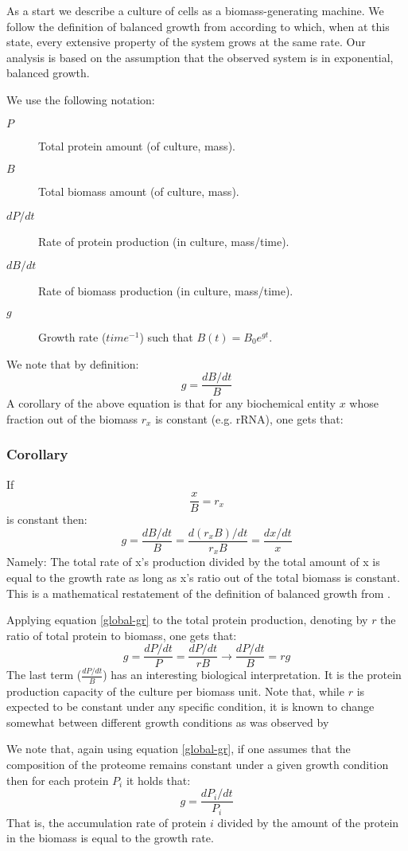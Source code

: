 \documentclass[a4page,notitlepage]{article}
\begin{document}
As a start we describe a culture of cells as a biomass-generating machine.
We follow the definition of balanced growth from \parencite{Campbell1957} according to which, when at this state, every extensive property of the system grows at the same rate.
Our analysis is based on the assumption that the observed system is in exponential, balanced growth.

We use the following notation:
\begin{description}
\item[$P$] Total protein amount (of culture, mass).
\item[$B$] Total biomass amount (of culture, mass).
\item [$dP/dt$] Rate of protein production (in culture, mass/time).
\item [$dB/dt$] Rate of biomass production (in culture, mass/time).
\item [$g$] Growth rate ($time^{-1}$) such that $B(t)=B_0e^{gt}$.
\end{description}
We note that by definition:
\[ g=\frac{dB/dt}{B}\]
A corollary of the above equation is that for any biochemical entity $x$ whose fraction out of the biomass $r_x$ is constant (e.g. rRNA), one gets that:
\subsubsection{Corollary}
If
\[\frac{x}{B}=r_x\]
is constant then:
\begin{equation}
\label{global-gr}
g=\frac{dB/dt}{B}=\frac{d(r_xB)/dt}{r_xB}=\frac{dx/dt}{x}
\end{equation}
Namely: The total rate of x's production divided by the total amount of x is equal to the growth rate as long as x's ratio out of the total biomass is constant.
This is a mathematical restatement of the definition of balanced growth from \parencite{Campbell1957}.

Applying equation \ref{global-gr} to the total protein production, denoting by $r$ the ratio of total protein to biomass, one gets that:
\[g=\frac{dP/dt}{P}=\frac{dP/dt}{rB}\rightarrow\frac{dP/dt}{B}=rg\]
The last term ($\frac{dP/dt}{B}$) has an interesting biological interpretation.
It is the protein production capacity of the culture per biomass unit.
Note that, while $r$ is expected to be constant under any specific condition, it is known to change somewhat between different growth conditions as was observed by \parencite{Bremer1987}

We note that, again using equation \ref{global-gr}, if one assumes that the composition of the proteome remains constant under a given growth condition then for each protein $P_i$ it holds that:
\[g=\frac{dP_i/dt}{P_i}\]
That is, the accumulation rate of protein $i$ divided by the amount of the protein in the biomass is equal to the growth rate.
\end{document}
